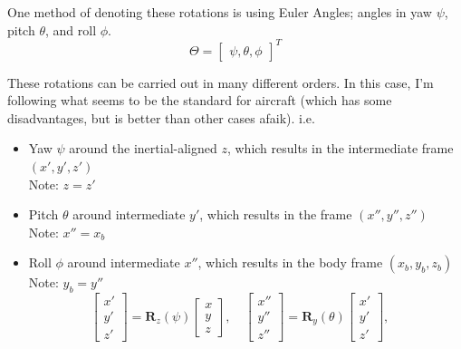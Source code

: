 One method of denoting these rotations is using Euler Angles; angles in yaw \( \psi \), pitch \( \theta \), and roll \( \phi \).
\begin{equation} \nonumber
    \Theta = \begin{bmatrix}
        \psi, \theta, \phi
    \end{bmatrix}^T
\end{equation}

These rotations can be carried out in many different orders. In this case, I'm following what seems to be the standard for aircraft (which has some disadvantages, but is better than other cases afaik). i.e.
\begin{itemize}
    \item Yaw \( \psi \) around the inertial-aligned \( z \), which results in the intermediate frame \((x', y', z')\)\\
          Note: \(z=z'\)
    \item Pitch \( \theta \) around intermediate \( y' \), which results in the frame \((x'', y'', z'')\)\\
          Note: \(x''=x_b\)
    \item Roll \( \phi \) around intermediate \( x'' \), which results in the body frame \((x_b, y_b, z_b)\)\\
          Note: \(y_b=y''\)
          \begin{equation} \nonumber
              \begin{bmatrix}
                  x' \\
                  y' \\
                  z'
              \end{bmatrix} = \mathbf{R}_z(\psi)
              \begin{bmatrix}
                  x \\
                  y \\
                  z
              \end{bmatrix}, \quad
              \begin{bmatrix}
                  x'' \\
                  y'' \\
                  z''
              \end{bmatrix} = \mathbf{R}_y(\theta)
              \begin{bmatrix}
                  x' \\
                  y' \\
                  z'
              \end{bmatrix}, \quad

\end{equation}
\end{itemize}
